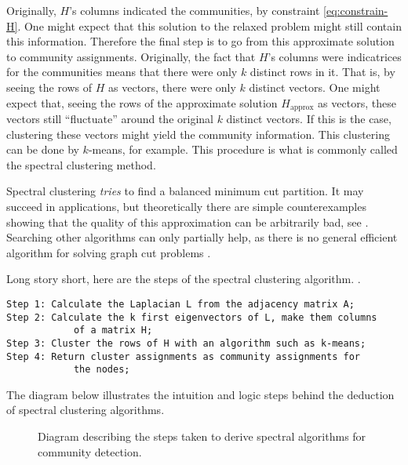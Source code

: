 \documentclass[../../main.tex]{subfiles} %
\begin{document}
Originally, \(H\)'s columns indicated the communities, by constraint 
\eqref{eq:constrain-H}. One might expect that this solution to the relaxed 
problem might still contain this information. Therefore the final step is to go 
from this approximate solution to community assignments. Originally, the fact 
that \(H\)'s columns were indicatrices for the communities means that there 
were only \(k\) distinct rows in it. That is, by seeing the rows of \(H\) as 
vectors, there were only \(k\) distinct vectors. One might expect that, seeing 
the rows of the approximate solution \(H_{\text{approx}}\) as vectors, these 
vectors still ``fluctuate'' around the original \(k\) distinct vectors. If this is the 
case, clustering these vectors might yield the community information. This 
clustering can be done by \(k\)-means, for example. This procedure is what is 
commonly called the spectral clustering method. 




\begin{remark}
	Spectral clustering \textit{tries} to find a balanced minimum cut partition. It 
	may succeed in applications, but theoretically there are simple 
	counterexamples showing that the quality of this approximation can be 
	arbitrarily bad, see \cite{von_luxburg_tutorial_2007}. Searching other 
	algorithms can only partially help, as there is no general efficient algorithm 
	for solving graph cut problems .
\end{remark}

Long story short, here are the steps of the spectral clustering algorithm.
.
\begin{verbatim}
Step 1: Calculate the Laplacian L from the adjacency matrix A;
Step 2: Calculate the k first eigenvectors of L, make them columns
            of a matrix H;
Step 3: Cluster the rows of H with an algorithm such as k-means;
Step 4: Return cluster assignments as community assignments for
            the nodes;
\end{verbatim}

The diagram below illustrates the intuition and logic steps behind the deduction 
of spectral clustering algorithms.
\begin{figure}[ht]
	\centering
	\caption{Diagram describing the steps taken to derive spectral algorithms for 
	community detection.}
	\label{fig:diagram-spectral-algorithms}
\end{figure}
\end{document}
